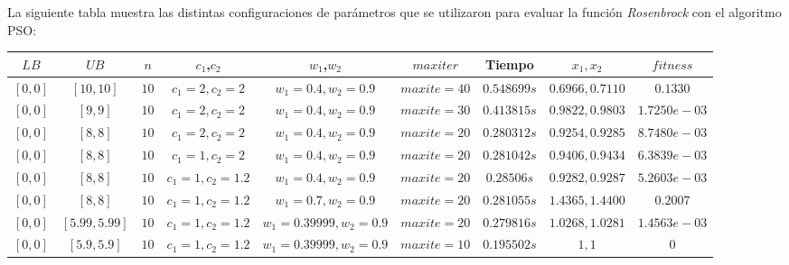 \documentclass[12pt, a4paper]{article}
\begin{document}
        La siguiente tabla muestra las distintas configuraciones de parámetros que se utilizaron para evaluar la función \emph{Rosenbrock} con el algoritmo PSO:

        \begin{table}[!ht]
            \begin{adjustbox}{width=\textwidth}
                \begin{tabular}{|c|c|c|c|c|c|c|c|c|}
                \rowcolor{yellow}
                \hline
                $LB$ & $UB$ & $n$ & $c_1$,$c_2$ & $w_1$,$w_2$ & $maxiter$ & Tiempo & $x_1,x_2$ & $fitness$ \\
                \hline
                \([0,0]\) & \([10,10]\) & \(10\) & \(c_1=2,c_2=2\) & \(w_1=0.4,w_2=0.9\) & \(maxite=40\) & \(0.548699s\) & \(0.6966,0.7110\) & \(0.1330\) \\
                \hline
                \([0,0]\) & \([9,9]\) & \(10\) & \(c_1=2,c_2=2\) & \(w_1=0.4,w_2=0.9\) & \(maxite=30\) & \(0.413815s\) & \(0.9822,0.9803\) & \(1.7250e-03\) \\
                \hline
                \([0,0]\) & \([8,8]\) & \(10\) & \(c_1=2,c_2=2\) & \(w_1=0.4,w_2=0.9\) & \(maxite=20\) & \(0.280312s\) & \(0.9254,0.9285\) & \(8.7480e-03\) \\
                \hline
                \([0,0]\) & \([8,8]\) & \(10\) & \(c_1=1,c_2=2\) & \(w_1=0.4,w_2=0.9\) & \(maxite=20\) & \(0.281042s\) & \(0.9406,0.9434\) & \(6.3839e-03\) \\
                \hline
                \([0,0]\) & \([8,8]\) & \(10\) & \(c_1=1,c_2=1.2\) & \(w_1=0.4,w_2=0.9\) & \(maxite=20\) & \(0.28506s\) & \(0.9282,0.9287\) & \(5.2603e-03\) \\
                \hline
                \([0,0]\) & \([8,8]\) & \(10\) & \(c_1=1,c_2=1.2\) & \(w_1=0.7,w_2=0.9\) & \(maxite=20\) & \(0.281055s\) & \(1.4365,1.4400\) & \(0.2007\) \\
                \hline
                \([0,0]\) & \([5.99,5.99]\) & \(10\) & \(c_1=1,c_2=1.2\) & \(w_1=0.39999,w_2=0.9\) & \(maxite=20\) & \(0.279816s\) & \(1.0268,1.0281\) & \(1.4563e-03\) \\
                \hline
                \([0,0]\) & \([5.9,5.9]\) & \(10\) & \(c_1=1,c_2=1.2\) & \(w_1=0.39999,w_2=0.9\) & \(maxite=10\) & \(0.195502s\) & \(1,1\) & \(0\) \\
                \hline
                \end{tabular}
            \end{adjustbox}
        \end{table}
\end{document}
